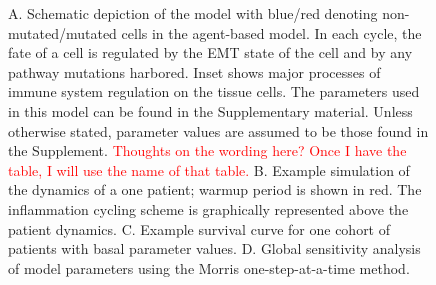 \documentclass[11pt, preprint]{article}
\newcommand{\tcr} { \textcolor{red} }
\begin{document}
\begin{figure}[H]
\center
{}
\caption{A. Schematic depiction of the model with blue/red denoting non-mutated/mutated cells in the agent-based model. In each cycle, the fate of a cell is regulated by the EMT state of the cell and by any pathway mutations harbored. Inset shows major processes of immune system regulation on the tissue cells. The parameters used in this model can be found in the Supplementary material. Unless otherwise stated, parameter values are assumed to be those found in the Supplement. \tcr{Thoughts on the wording here? Once I have the table, I will use the name of that table.}
B. Example simulation of the dynamics of a one patient; warmup period is shown in red.
The inflammation cycling scheme is graphically represented above the patient dynamics.
C. Example survival curve for one cohort of patients with basal parameter values.
D. Global sensitivity analysis of model parameters using the Morris one-step-at-a-time method.}
\label{fig:ModelIntro}
\end{figure}
\end{document}
